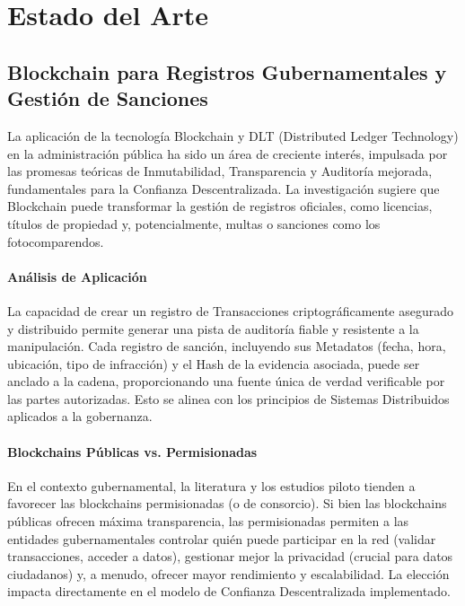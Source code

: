 \section{\large Estado del Arte}  

\subsection{Blockchain para Registros Gubernamentales y Gestión de Sanciones} 

La aplicación de la tecnología Blockchain y DLT (Distributed Ledger Technology) en la administración pública ha sido un área de creciente interés, impulsada por las promesas teóricas de Inmutabilidad, Transparencia y Auditoría mejorada, fundamentales para la Confianza Descentralizada. La investigación sugiere que Blockchain puede transformar la gestión de registros oficiales, como licencias, títulos de propiedad y, potencialmente, multas o sanciones como los fotocomparendos. 

\paragraph{Análisis de Aplicación}
La capacidad de crear un registro de Transacciones criptográficamente asegurado y distribuido permite generar una pista de auditoría fiable y resistente a la manipulación. Cada registro de sanción, incluyendo sus Metadatos (fecha, hora, ubicación, tipo de infracción) y el Hash de la evidencia asociada, puede ser anclado a la cadena, proporcionando una fuente única de verdad verificable por las partes autorizadas. Esto se alinea con los principios de Sistemas Distribuidos aplicados a la gobernanza. 

\paragraph{Blockchains Públicas vs. Permisionadas}
En el contexto gubernamental, la literatura y los estudios piloto tienden a favorecer las blockchains permisionadas (o de consorcio). Si bien las blockchains públicas ofrecen máxima transparencia, las permisionadas permiten a las entidades gubernamentales controlar quién puede participar en la red (validar transacciones, acceder a datos), gestionar mejor la privacidad (crucial para datos ciudadanos) y, a menudo, ofrecer mayor rendimiento y escalabilidad. La elección impacta directamente en el modelo de Confianza Descentralizada implementado. 

